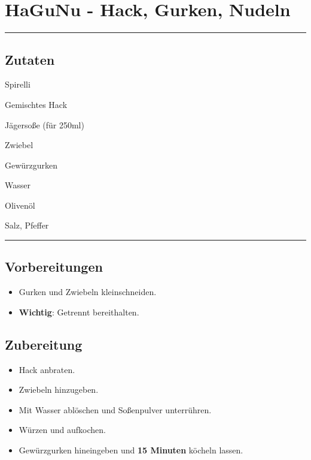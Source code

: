 \section*{HaGuNu - Hack, Gurken, Nudeln}

\bigbreak
\rule{\textwidth}{0.4pt}

\subsection*{Zutaten}

\begin{description}[align=right,leftmargin=!,labelwidth=\widthof{\bfseries xxPrisen}]
    \item[500g] Spirelli
    \item[500g] Gemischtes Hack
    \item[1 Pkg] Jägersoße (für 250ml)
    \item[1] Zwiebel
    \item[*] Gewürzgurken
    \item[250ml] Wasser
    \item[*] Olivenöl
    \item[Gewürze] Salz, Pfeffer
\end{description}


\rule{\textwidth}{0.4pt}


\subsection*{Vorbereitungen}

\begin{itemize}
    \item Gurken und Zwiebeln kleinschneiden.
    \item \textbf{Wichtig}: Getrennt bereithalten.
\end{itemize}


\bigbreak
\subsection*{Zubereitung}

\begin{itemize}
    \item Hack anbraten.
    \item Zwiebeln hinzugeben.
    \item Mit Wasser ablöschen und Soßenpulver unterrühren.
    \item Würzen und aufkochen.
    \item Gewürzgurken hineingeben und \textbf{15 Minuten} köcheln lassen.
\end{itemize}